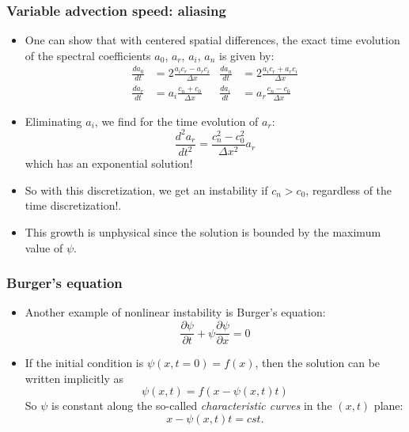\documentclass[aspectratio=43,9pt]{beamer}
\begin{document}
%
%
\begin{frame}
	\frametitle{Variable advection speed: aliasing}
	\begin{itemize}
		\item One can show that with centered spatial differences, the exact time evolution of the spectral coefficients $a_0$, $a_r$, $a_i$, $a_n$ is given by:
			\begin{align*}
				\frac{d a_0}{dt} &= 2 \frac{a_i c_r - a_r c_i}{\Delta x}	&
				\frac{d a_n}{dt} &= 2 \frac{a_i c_r + a_r c_i}{\Delta x}	\\
				\frac{d a_r}{dt} &= a_i \frac{c_n + c_0}{\Delta x}	&
				\frac{d a_i}{dt} &= a_r \frac{c_n - c_0}{\Delta x}
			\end{align*}
		\item Eliminating $a_i$, we find for the time evolution of $a_r$:
			\begin{equation*}
				\frac{d^2 a_r}{dt^2} = \frac{c_n^2 - c_0^2}{\Delta x^2} a_r
			\end{equation*}
			which has an exponential solution!
		\item So with this discretization, we get an instability if $c_n > c_0$, regardless of the time discretization!.
		\item This growth is unphysical since the solution is bounded by the maximum value of $\psi$.
	\end{itemize}
\end{frame}
%
%
\begin{frame}
	\frametitle{Burger's equation}
	\begin{itemize}
		\item Another example of nonlinear instability is Burger's equation:
			\begin{equation*}
			 \frac{\partial \psi}{\partial t} + \psi \frac{\partial \psi}{\partial x} = 0
			\end{equation*}
		\item If the initial condition is $\psi(x,t=0)=f(x)$, then the solution can be written implicitly as
			\begin{equation*}
				\psi(x,t) = f ( x - \psi(x,t) t)
			\end{equation*}
			So $\psi$ is constant along the so-called \emph{characteristic curves} in the $(x,t)$ plane:
			\begin{equation*}
				x - \psi(x,t) t = cst.
			\end{equation*}
	\end{itemize}
\end{frame}
\end{document}
